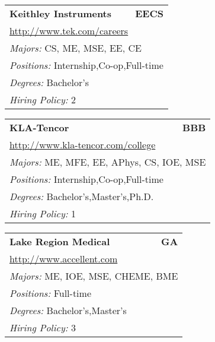 \documentclass[twoside]{article}
\begin{document}
\begin{center}
\begin{multicols}{3}
\begin{FlushLeft}
\begin{minipage}{.9\columnwidth}
\end{minipage}
 
\begin{minipage}{.9\columnwidth}\begin{tabularx}{.95\columnwidth}{Xr}
                 {\Large\bf Keithley Instruments} & {\Large\bf EECS}\\
    \multicolumn{2}{p{.95\columnwidth}}{\url{http://www.tek.com/careers}}\\
    \multicolumn{2}{p{.95\columnwidth}}{\emph{Majors:} CS, ME, MSE, EE, CE}\\
    \multicolumn{2}{p{.95\columnwidth}}{\emph{Positions:} Internship,Co-op,Full-time}\\
    \multicolumn{2}{p{.95\columnwidth}}{\emph{Degrees:} Bachelor's}\\
    \multicolumn{2}{p{.95\columnwidth}}{\emph{Hiring Policy:} 2}\\
    \end{tabularx}
    
\end{minipage}
 
\begin{minipage}{.9\columnwidth}\begin{tabularx}{.95\columnwidth}{Xr}
                 {\Large\bf KLA-Tencor} & {\Large\bf BBB}\\
    \multicolumn{2}{p{.95\columnwidth}}{\url{http://www.kla-tencor.com/college}}\\
    \multicolumn{2}{p{.95\columnwidth}}{\emph{Majors:} ME, MFE, EE, APhys, CS, IOE, MSE}\\
    \multicolumn{2}{p{.95\columnwidth}}{\emph{Positions:} Internship,Co-op,Full-time}\\
    \multicolumn{2}{p{.95\columnwidth}}{\emph{Degrees:} Bachelor's,Master's,Ph.D.}\\
    \multicolumn{2}{p{.95\columnwidth}}{\emph{Hiring Policy:} 1}\\
    \end{tabularx}
    
\end{minipage}
 
\begin{minipage}{.9\columnwidth}\begin{tabularx}{.95\columnwidth}{Xr}
                 {\Large\bf Lake Region Medical} & {\Large\bf GA}\\
    \multicolumn{2}{p{.95\columnwidth}}{\url{http://www.accellent.com}}\\
    \multicolumn{2}{p{.95\columnwidth}}{\emph{Majors:} ME, IOE, MSE, CHEME, BME}\\
    \multicolumn{2}{p{.95\columnwidth}}{\emph{Positions:} Full-time}\\
    \multicolumn{2}{p{.95\columnwidth}}{\emph{Degrees:} Bachelor's,Master's}\\
    \multicolumn{2}{p{.95\columnwidth}}{\emph{Hiring Policy:} 3}\\
    \end{tabularx}
    

\end{minipage}
\end{FlushLeft}
\end{multicols}
\end{center}
\end{document}

